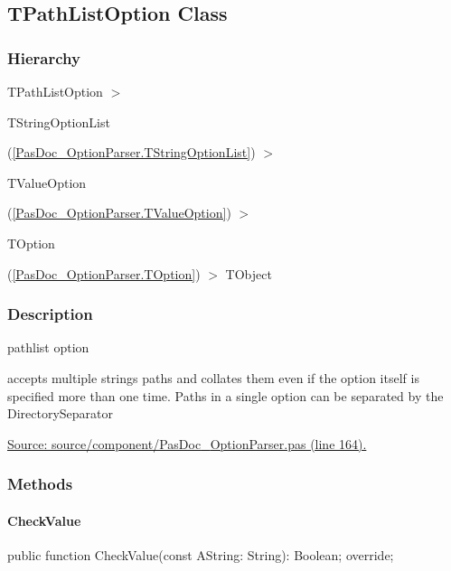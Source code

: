 \documentclass{report}
\newif\ifpdf
\begin{document}
\subsection*{TPathListOption Class}
\fi
\label{PasDoc_OptionParser.TPathListOption}
\subsubsection*{\large{\textbf{Hierarchy}}\normalsize\hspace{1ex}\hfill}
TPathListOption {$>$} \begin{ttfamily}TStringOptionList\end{ttfamily}(\ref{PasDoc_OptionParser.TStringOptionList}) {$>$} \begin{ttfamily}TValueOption\end{ttfamily}(\ref{PasDoc_OptionParser.TValueOption}) {$>$} \begin{ttfamily}TOption\end{ttfamily}(\ref{PasDoc_OptionParser.TOption}) {$>$} 
TObject
\subsubsection*{\large{\textbf{Description}}\normalsize\hspace{1ex}\hfill}
pathlist option\hfill\vspace*{1ex}

 accepts multiple strings paths and collates them even if the option itself is specified more than one time. Paths in a single option can be separated by the DirectorySeparator\par
\href{https://github.com/pasdoc/pasdoc/blob/master/source/component/PasDoc_OptionParser.pas#L164}{Source: source/component/PasDoc{\_}OptionParser.pas (line 164).}\subsubsection*{\large{\textbf{Methods}}\normalsize\hspace{1ex}\hfill}
\paragraph*{CheckValue}\hspace*{\fill}

\label{PasDoc_OptionParser.TPathListOption-CheckValue}
\begin{list}{}{
\setlength{\itemindent}{0cm}
\setlength{\listparindent}{0cm}
\setlength{\leftmargin}{\evensidemargin}
\addtolength{\leftmargin}{\tmplength}
\settowidth{\labelsep}{X}
\addtolength{\leftmargin}{\labelsep}
\setlength{\labelwidth}{\tmplength}
}
\item[\textbf{Declaration}\hfill]
\ifpdf
\begin{flushleft}
\fi
\begin{ttfamily}
public function CheckValue(const AString: String): Boolean; override;\end{ttfamily}

\ifpdf
\end{flushleft}
\fi

\end{list}
\ifpdf
\end{document}

